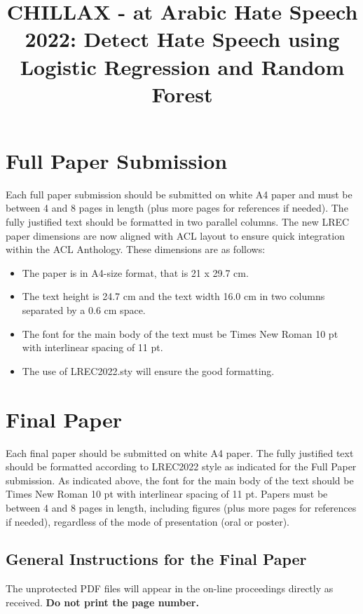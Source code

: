 \documentclass[10pt, a4paper]{article}
\title{\bf{CHILLAX - at Arabic Hate Speech 2022: Detect Hate Speech using Logistic Regression and Random Forest}}
\begin{document}
\maketitleabstract

\section{Full Paper Submission}

Each full paper submission should be submitted on white A4 paper and must be between 4 and 8 pages in length (plus more pages for references if needed). 
The fully justified text should be formatted in two parallel columns. The new LREC paper dimensions are now aligned with ACL layout to ensure quick integration within the ACL Anthology. These dimensions are as follows:   
\begin{itemize}
    \item{The paper is in A4-size format, that is 21 x 29.7 cm.}
    \item{The text height is 24.7 cm and the text width 16.0 cm in two columns separated by a 0.6 cm space.}
     \item {The font for the main body of the text must be Times New Roman 10 pt with interlinear spacing of 11 pt.}
     \item {The use of LREC2022.sty will ensure the good formatting.}
 \end{itemize}


\section{ Final Paper}

Each final paper should be submitted on white A4 paper. The fully justified text should be formatted according to LREC2022 style as indicated for the Full Paper submission.
As indicated above, the font for the main body of the text should be Times  New Roman 10 pt with interlinear spacing of 11 pt. Papers must be between 4 and 8 pages in length, including figures (plus more pages for references if needed), regardless of the mode of presentation (oral or poster).

\subsection{General Instructions for the Final Paper}
The unprotected PDF files will appear in the on-line proceedings directly as received. \textbf{Do not print the page number.}
\end{document}
